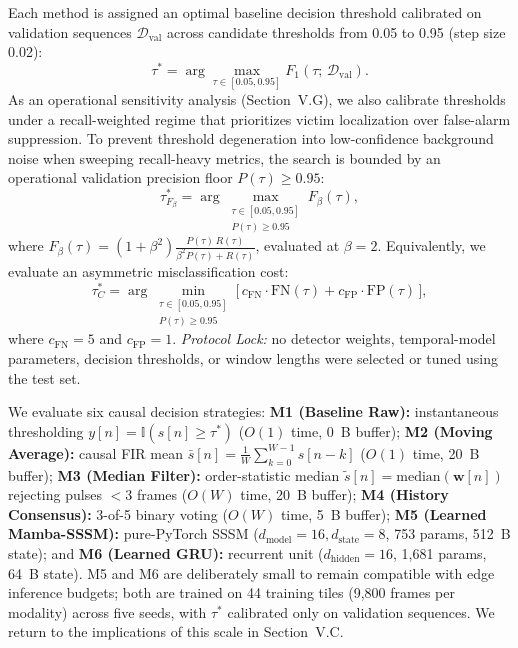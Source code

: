 \documentclass[conference]{IEEEtran}
\begin{document}
Each method is assigned an optimal baseline decision threshold calibrated on validation sequences $\mathcal{D}_{\text{val}}$ across candidate thresholds from 0.05 to 0.95 (step size 0.02):
\begin{equation}
\tau^* = \arg\max_{\tau \in [0.05, 0.95]} F_1(\tau; \, \mathcal{D}_{\text{val}}).
\label{eq:f1_opt}
\end{equation}
As an operational sensitivity analysis (Section~V.G), we also calibrate thresholds under a recall-weighted regime that prioritizes victim localization over false-alarm suppression. To prevent threshold degeneration into low-confidence background noise when sweeping recall-heavy metrics, the search is bounded by an operational validation precision floor $P(\tau) \ge 0.95$:
\begin{equation}
\tau^*_{F_\beta} = \arg\max_{\substack{\tau \in [0.05, 0.95] \\ P(\tau) \ge 0.95}} F_\beta(\tau),
\label{eq:fbeta}
\end{equation}
where $F_\beta(\tau) = (1+\beta^2)\frac{P(\tau)\,R(\tau)}{\beta^2 P(\tau) + R(\tau)}$, evaluated at $\beta=2$. Equivalently, we evaluate an asymmetric misclassification cost:
\begin{equation}
\tau^*_{C} = \arg\min_{\substack{\tau \in [0.05, 0.95] \\ P(\tau) \ge 0.95}} \big[\, c_{\text{FN}} \cdot \text{FN}(\tau) + c_{\text{FP}} \cdot \text{FP}(\tau) \,\big],
\label{eq:asymcost}
\end{equation}
where $c_{\text{FN}} = 5$ and $c_{\text{FP}} = 1$. \textit{Protocol Lock:} no detector weights, temporal-model parameters, decision thresholds, or window lengths were selected or tuned using the test set.

We evaluate six causal decision strategies: \textbf{M1 (Baseline Raw):} instantaneous thresholding $y[n] = \mathbb{I}(s[n] \ge \tau^*)$ ($O(1)$ time, 0~B buffer); \textbf{M2 (Moving Average):} causal FIR mean $\bar{s}[n] = \frac{1}{W}\sum_{k=0}^{W-1}s[n-k]$ ($O(1)$ time, 20~B buffer); \textbf{M3 (Median Filter):} order-statistic median $\tilde{s}[n] = \text{median}(\mathbf{w}[n])$ rejecting pulses $<3$ frames ($O(W)$ time, 20~B buffer); \textbf{M4 (History Consensus):} 3-of-5 binary voting ($O(W)$ time, 5~B buffer); \textbf{M5 (Learned Mamba-SSSM):} pure-PyTorch SSSM ($d_{\text{model}}=16, d_{\text{state}}=8$, 753 params, 512~B state); and \textbf{M6 (Learned GRU):} recurrent unit ($d_{\text{hidden}}=16$, 1,681 params, 64~B state).
M5 and M6 are deliberately small to remain compatible with edge inference budgets; both are trained on 44 training tiles (9,800 frames per modality) across five seeds, with $\tau^*$ calibrated only on validation sequences. We return to the implications of this scale in Section~V.C.
\end{document}

